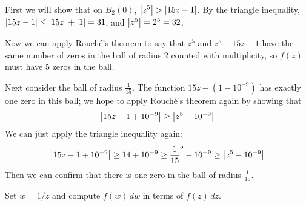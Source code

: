 \documentclass{homework}
\begin{document}
                                                                                                             \begin{solution}
                                                                                                             First we will show that on $B_2(0)$, $\left|z^5\right| > \left|15z-1\right|$. By the triangle inequality, $\left|15z-1\right| \leq \left|15z\right| + \left|1\right| = 31$, and $\left|z^5\right| = 2^5 = 32$.

                                                                                                             Now we can apply Rouch\'e's theorem to say that $z^5$ and $z^5+15z-1$ have the same number of zeros in the ball of radius 2 counted with multiplicity, so $f(z)$ must have $5$ zeros in the ball.

                                                                                                             Next consider the ball of radius $\frac{1}{15}$. The function $15z-(1-10^{-9})$ has exactly one zero in this ball; we hope to apply Rouch\'e's theorem again by showing that 
                                                                                                             \[
                                                                                                             \left|15z-1+10^{-9}\right| \geq \left|z^5 - 10^{-9}\right|
                                                                                                             \]
                                                                                                             We can just apply the triangle inequality again:
                                                                                                             \[
                                                                                                             \left|15z-1+10^{-9}\right| \geq 14 + 10^{-9} \geq \frac{1}{15}^5 - 10^{-9} \geq \left|z^5 - 10^{-9}\right|
                                                                                                             \]
                                                                                                             Then we can confirm that there is one zero in the ball of radius $\frac{1}{15}$.

                                                                                                             \end{solution}
                                                                                                             \begin{problem}\label{form-at-infinity}
                                                                                                             Set $w = 1/z$ and compute $f(w) \, dw$ in terms of $f(z) \, dz$.
                                                                                                             \end{problem}
\end{document}
